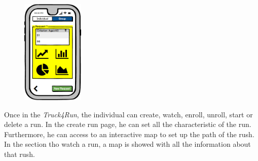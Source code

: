 \documentclass[a4paper]{article}
\begin{document}
\begin{figure}[!htpb]
     	\includegraphics[height=50mm]{images/mockups/ViewData2.png}		
         \end{figure}
        
        \newpage
Once in the \textit{Truck4Run}, the individual can create, watch, enroll, unroll, start or delete a run.  In the create run page, he can set all the characteristic of the run. Furthermore, he can access to an interactive map to set up the path of the rush. In the section tho watch a run, a map is showed with all the information about that rush.
\end{document}
